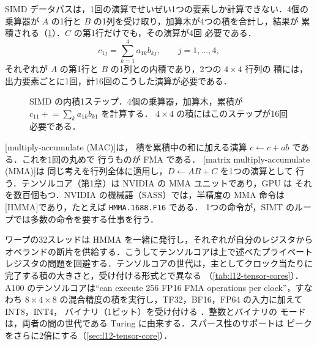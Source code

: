 \documentclass[../main.tex]{subfiles}
\begin{document}
SIMD データパスは，1回の演算でせいぜい1つの要素しか計算できない．4個の
乗算器が $A$ の1行と $B$ の1列を受け取り，加算木が4つの積を合計し，結果が
累積される（\cref{fig:l12-dot-unit}）．$C$ の第1行だけでも，その演算が4回
必要である．
\[
  c_{1j} = \sum_{k=1}^{4} a_{1k} b_{kj} , \qquad j = 1, \ldots, 4 ,
\]
それぞれが $A$ の第1行と $B$ の1列との内積であり，2つの $4 \times 4$ 行列の
積には，出力要素ごとに1回，計16回のこうした演算が必要である．

\begin{figure}[tb]
  \centering
  
  \caption{SIMD の内積1ステップ．4個の乗算器，加算木，累積が
    $c_{11} \mathrel{+}= \sum_k a_{1k} b_{k1}$ を計算する．
    $4 \times 4$ の積にはこのステップが16回必要である．}
  \label{fig:l12-dot-unit}
\end{figure}

\begin{definition}
  [multiply-accumulate (MAC)]は，
  積を累積中の和に加える演算 $c \leftarrow c + a b$ である．これを1回の丸めで
  行うものが FMA である．
  [matrix multiply-accumulate (MMA)]は
  同じ考えを行列全体に適用し，$D \leftarrow A B + C$ を1つの演算として
  行う．テンソルコア（第1章）は NVIDIA の MMA ユニットであり，GPU は
  それを数百個もつ．NVIDIA の機械語（SASS）では，半精度の MMA 命令は
  [HMMA]であり，たとえば \texttt{HMMA.1688.F16} である．
  1つの命令が，SIMT のループでは多数の命令を要する仕事を行う．
\end{definition}


ワープの32スレッドは HMMA を一緒に発行し，それぞれが自分のレジスタから
オペランドの断片を供給する．こうしてテンソルコアは上で述べたプライベート
レジスタの問題を回避する．テンソルコアの世代は，主としてクロック当たりに
完了する積の大きさと，受け付ける形式とで異なる
（\cref{tab:l12-tensor-cores}）．A100 のテンソルコアは\enquote{can
execute 256 FP16 FMA operations per clock}，すなわち $8 \times 4 \times 8$
の混合精度の積を実行し，TF32，BF16，FP64 の入力に加えて INT8，INT4，
バイナリ（1ビット）を受け付ける \cite{nvidia2020ampere}．整数とバイナリの
モードは，両者の間の世代である Turing に由来する．スパース性のサポートは
ピークをさらに2倍にする（\cref{sec:l12-tensor-core}）．
\end{document}
